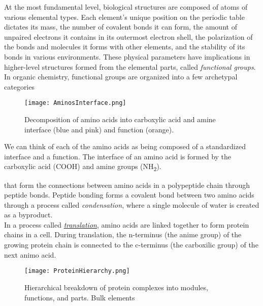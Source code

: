 {At the most fundamental level, biological structures are composed of atoms of various elemental types.  Each element's unique position on the periodic table dictates its mass, the number of covalent bonds it can form, the amount of unpaired electrons it contains in its outermost electron shell, the polarization of the bonds and molecules it forms with other elements, and the stability of its bonds in various environments.  These physical parameters have implications in higher-level structures formed from the elemental parts, called \textit{functional groups}.\\



In organic chemistry, functional groups are organized into a few archetypal categories \\

\begin{figure}
  \texttt{[image: AminosInterface.png]}
  \caption{Decomposition of amino acids into carboxylic acid and amine interface (blue and pink) and function (orange).}
  \label{fig:AminosInterface}
\end{figure}

We can think of each of the amino acids as being composed of a standardized interface and a function.  The interface of an amino acid is formed by the carboxylic acid (COOH) and amine groups (NH\textsubscript{2}).  



 that form the connections between amino acids in a polypeptide chain through peptide bonds.  Peptide bonding forms a covalent bond between two amino acids through a process called \textit{condensation}, where a single molecule of water is created as a byproduct.\\

In a process called \href{https://en.wikipedia.org/wiki/Translation_%28biology%29}{\textit{translation}}, amino acids are linked together to form protein chains in a cell.  During translation, the n-terminus (the anime group) of the growing protein chain is connected to the c-terminus (the carboxilic group) of the next animo acid.

\begin{sidewaysfigure}
  \texttt{[image: ProteinHierarchy.png]}
  \caption{Hierarchical breakdown of protein complexes into modules, functions, and parts.  Bulk elements}
  \label{fig:ProteinHierarchy}
\end{sidewaysfigure}

}
